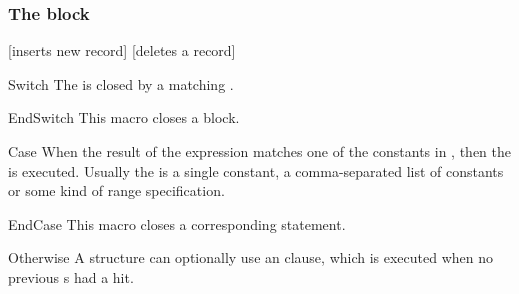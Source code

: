 \documentclass[a4paper, 11pt]{article}
\begin{document}
\subsubsection{The  block}

\begin{PDExample}
    \begin{algorithmic}
        [inserts new record]
        \EndCase
        [deletes a record]
        \EndCase
        \Otherwise
        \EndOtherwise
        \EndSwitch
    \end{algorithmic}
\end{PDExample}


\begin{Macrodef}{Switch}{}{}
    The  is closed by a matching .

    \BlockOptionsText
\end{Macrodef}

\begin{Macrodef}{EndSwitch}{}{}
    This macro closes a  block.

    \MacroOptionsText
\end{Macrodef}

\begin{Macrodef}{Case}{}{}
    When the result of the  expression matches one of the constants in , then the  is executed. Usually the  is a single constant, a comma-separated list of constants or some kind of range specification.

    \BlockOptionsText
\end{Macrodef}

\begin{Macrodef}{EndCase}{}{}
    This macro closes a corresponding  statement.

    \MacroOptionsText
\end{Macrodef}

\begin{Macrodef}{Otherwise}{}{}
    A  structure can optionally use an  clause, which is executed when no previous s had a hit.

    \BlockOptionsText
\end{Macrodef}
\end{document}
